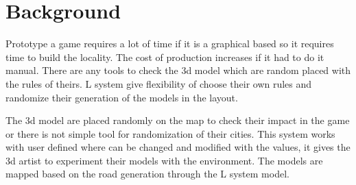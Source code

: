 \chapter{Background}

\Large Prototype a game requires a lot of time if it is a graphical based so it requires time to build the locality. The cost of production increases if it had to do it manual. There are any tools to check the 3d model which are random placed with the rules of theirs. L system give flexibility of choose their own rules and randomize their generation of the models in the layout.

\vspace{0.5cm}

\Large The 3d model are placed randomly on the map to check their impact in the game or there is not simple tool for randomization of their cities. This system works with user defined where can be changed and modified with the values, it gives the 3d artist to experiment their models with the environment. The models are mapped based on the road generation through the L system model.